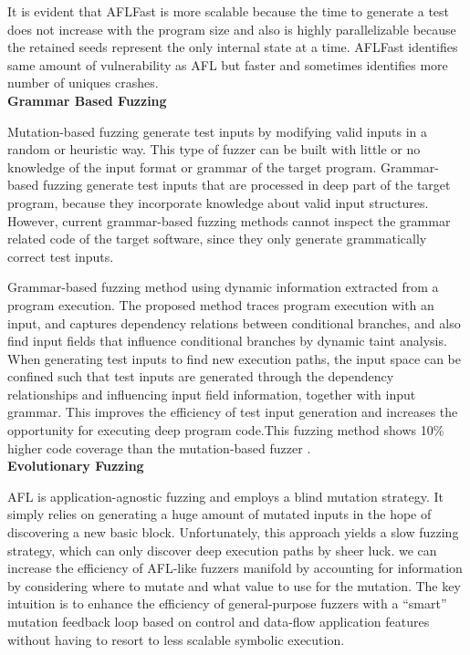 \documentclass[a4paper, 11pt]{article}
\begin{document}
It is evident that AFLFast is more scalable because the time to generate a test does not increase with the program size and also is highly parallelizable because the retained seeds represent the only internal state at a time. AFLFast identifies same amount of vulnerability as AFL but faster and sometimes identifies more number of uniques crashes.\\

\noindent
\textbf{Grammar Based Fuzzing}

Mutation-based fuzzing generate test inputs by modifying valid inputs in a random or heuristic way. This type of fuzzer can be built with little or no knowledge of the input format or grammar of the target program. Grammar-based fuzzing generate test inputs that are processed in deep part of the target program, because they incorporate knowledge about valid input structures. However, current grammar-based fuzzing methods cannot inspect the grammar related code of the target software, since they only generate grammatically correct test inputs. 

Grammar-based fuzzing method using dynamic information extracted from a program execution. The proposed method traces program execution with an input, and captures dependency relations between conditional branches, and also find input fields that influence conditional branches by dynamic taint analysis. When generating test inputs to find new execution paths, the input space can be confined such that test inputs are generated through the dependency relationships and influencing input field information, together with input grammar. This improves the efficiency of test input generation and increases the opportunity for executing deep program code.This fuzzing method shows 10\% higher code coverage than the mutation-based fuzzer \cite{grammerfuzzing}.\\

\noindent
\textbf{Evolutionary Fuzzing}

AFL is application-agnostic fuzzing and employs a blind mutation strategy. It simply relies on generating a huge amount of mutated inputs in the hope of discovering a new basic block. Unfortunately, this approach yields a slow fuzzing strategy, which can only discover deep execution paths by sheer luck. we can increase the efficiency of AFL-like fuzzers manifold by accounting for information by considering where to mutate and what value to use for the mutation. The key intuition is to enhance the efficiency of general-purpose fuzzers with a ``smart'' mutation feedback loop based on control and data-flow application features without having to resort to less scalable symbolic execution.
\end{document}
